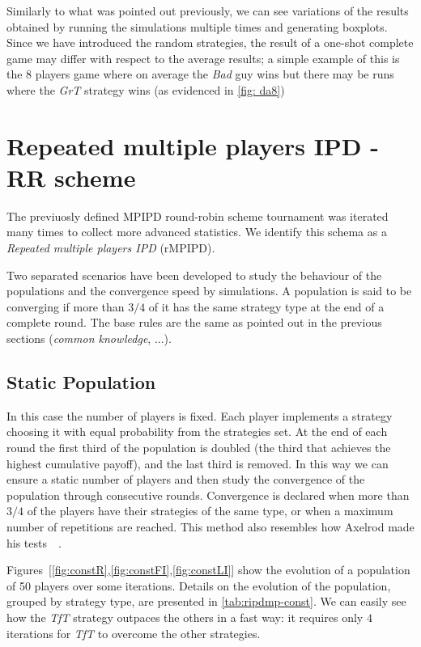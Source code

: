 \documentclass[journal,a4paper,10pt,twoside]{IEEEtran} %
\begin{document}
Similarly to what was pointed out previously, we can see variations of the results obtained by running the simulations multiple times and generating boxplots. 
Since we have introduced the random strategies, the result of a one-shot complete game may differ with respect to the average results; a simple example of this is the 8 players game where on average the \textit{Bad} guy wins but there may be runs where the \textit{GrT} strategy wins (as evidenced in \autoref{fig: da8}) 

\section{Repeated multiple players IPD - RR scheme} \label{s:rIPDMP}
The previuosly defined MPIPD round-robin scheme tournament was iterated many times to collect more advanced statistics.
We identify this schema as a \textit{Repeated multiple players IPD} (rMPIPD).

Two separated scenarios have been developed to study the behaviour of the populations and the convergence speed by simulations. A population is said to be converging if more than $3/4$ of it has the same strategy type at the end of a complete round. The base rules are the same as pointed out in the previous sections (\textit{common knowledge}, ...).

\subsection{Static Population}
In this case the number of players is fixed. Each player implements a strategy choosing it with equal probability from the strategies set. At the end of each round the first third of the population is doubled (the third that achieves the highest cumulative payoff), and the last third is removed. In this way we can ensure a static number of players and then study the convergence of the population through consecutive rounds.
Convergence is declared when more than $3/4$ of the players have their strategies of the same type, or when a maximum number of repetitions are reached.
This method also resembles how Axelrod made his tests~\cite[\S 2.6]{mathieu2017}~\cite{axelrod1984evolution}.

Figures~[\ref{fig:constR},\ref{fig:constFI},\ref{fig:constLI}] show the evolution of a population of 50 players over some iterations.
Details on the evolution of the population, grouped by strategy type, are presented in \autoref{tab:ripdmp-const}.
We can easily see how the \textit{TfT} strategy outpaces the others in a fast way: it requires only $4$ iterations for \textit{TfT} to overcome the other strategies.
\end{document}
